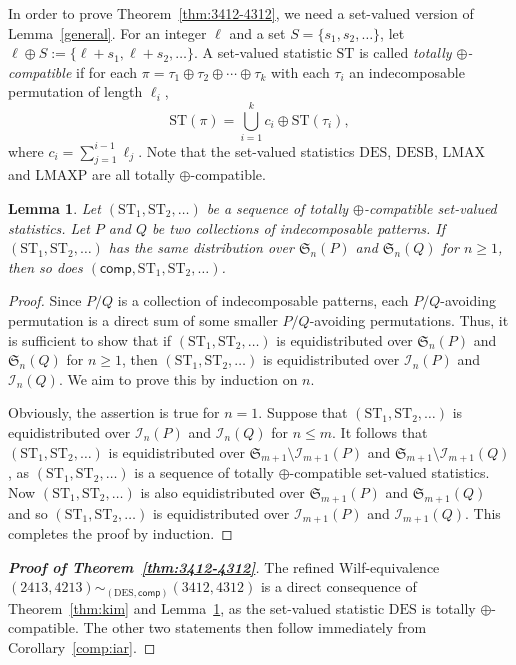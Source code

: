 \documentclass[12pt]{amsart}
\numberwithin{equation}{section}
\theoremstyle{plain}
\newtheorem{lemma}[theorem]{Lemma}
\theoremstyle{definition}
\def\S{\mathfrak{S}}
\def\comp{\mathsf{comp}}
\def\DES{\mathrm{DES}}
\def\LMAX{\mathrm{LMAX}}
\def\LMAXP{\mathrm{LMAXP}}
\def\DESB{\mathrm{DESB}}
\newcommand{\In}{\mathcal{I}}
\def\DESB{\mathrm{DESB}}
\def\ST{\mathrm{ST}}
\begin{document}
In order to prove Theorem~\ref{thm:3412-4312}, we need a set-valued version of Lemma~\ref{general}. For an integer $\ell$ and a set $S=\{s_1,s_2,\ldots\}$, let $\ell\oplus S:=\{\ell+s_1,\ell+s_2,\ldots\}$. A set-valued statistic $\ST$ is called {\em totally $\oplus$-compatible} if for each $\pi=\tau_1\oplus\tau_2\oplus\cdots\oplus\tau_k$ with each $\tau_i$ an indecomposable permutation of length $\ell_i$, 
$$
\ST(\pi)=\bigcup_{i=1}^k c_i\oplus\ST(\tau_i),
$$
where $c_i=\sum_{j=1}^{i-1}\ell_j$. Note that the set-valued statistics $\DES$, $\DESB$, $\LMAX$ and $\LMAXP$ are all totally $\oplus$-compatible. 

\begin{lemma}\label{gen:setv}
Let $(\ST_1,\ST_2,\ldots)$ be a sequence of  totally  $\oplus$-compatible set-valued statistics.
Let $P$ and $Q$ be two collections of indecomposable patterns. If $(\ST_1,\ST_2,\ldots)$ has the same distribution over $\S_n(P)$ and $\S_n(Q)$ for $n\geq1$, then so does $(\comp,\ST_1,\ST_2,\ldots)$.
\end{lemma}
\begin{proof}
Since $P/Q$ is a collection of indecomposable patterns, each $P/Q$-avoiding  permutation is a direct sum of some smaller $P/Q$-avoiding  permutations. Thus, it is sufficient to show that if $(\ST_1,\ST_2,\ldots)$ is equidistributed over $\S_n(P)$ and $\S_n(Q)$ for $n\geq1$, then $(\ST_1,\ST_2,\ldots)$ is equidistributed over $\In_n(P)$ and $\In_n(Q)$. We aim to prove this by induction on $n$. 

Obviously, the assertion is true for $n=1$. Suppose that $(\ST_1,\ST_2,\ldots)$ is equidistributed over $\In_n(P)$ and $\In_n(Q)$ for $n\leq m$. It follows that  $(\ST_1,\ST_2,\ldots)$ is equidistributed over $\S_{m+1}\setminus\In_{m+1}(P)$ and $\S_{m+1}\setminus\In_{m+1}(Q)$, as $(\ST_1,\ST_2,\ldots)$ is a sequence of  totally  $\oplus$-compatible set-valued statistics. Now $(\ST_1,\ST_2,\ldots)$ is also equidistributed over $\S_{m+1}(P)$ and $\S_{m+1}(Q)$ and so $(\ST_1,\ST_2,\ldots)$ is equidistributed over $\In_{m+1}(P)$ and $\In_{m+1}(Q)$. This completes the proof by induction. 
\end{proof}

\begin{proof}[{\bf Proof of Theorem~\ref{thm:3412-4312}}]
The refined Wilf-equivalence $(2413,4213)\sim_{(\DES,\comp)}(3412,4312)$ is a direct consequence of Theorem~\ref{thm:kim} and Lemma~\ref{gen:setv}, as the set-valued statistic $\DES$ is totally $\oplus$-compatible. The other two statements then follow immediately from Corollary~\ref{comp:iar}. 
\end{proof}
\end{document}

